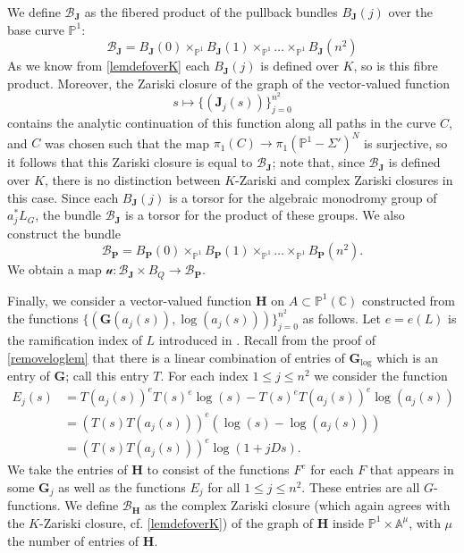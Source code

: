 \documentclass[10pt]{article}
\numberwithin{equation}{section}
\theoremstyle{plain}
\theoremstyle{definition}
\theoremstyle{remark}
\newcommand{\PP}{\mathbb{P}}
\begin{document}
We define $\mathcal{B}_{\mathbf{J}}$ as the fibered product of the pullback bundles $B_{\mathbf{J}}(j)$ over the base curve $\mathbb{P}^1$:
\[ \mathcal{B}_{\mathbf{J}} = B_{\mathbf{J}}(0) \times_{\mathbb{P}^1} B_{\mathbf{J}}(1) \times_{\mathbb{P}^1} \dots \times_{\mathbb{P}^1} B_{\mathbf{J}}(n^2) \]
As we know from \autoref{lemdefoverK} each $B_{\mathbf{J}}(j)$ is defined over $K$, so is this fibre product. Moreover, the Zariski closure of the graph of the vector-valued function
\begin{equation}
\label{BGgrapheq}
s \mapsto \{ (\mathbf{J}_{j}(s)) \}^{n^2}_{j=0} 
\end{equation}
contains the analytic continuation of this function along all paths in the curve $C$, and $C$ was chosen such that the map $\pi_1(C) \to \pi_1(\mathbb{P}^1 - \Sigma')^{N}$ is surjective, so it follows that this Zariski closure is equal to $\mathcal{B}_{\mathbf{J}}$; note that, since $\mathcal{B}_{\mathbf{J}}$ is defined over $K$, there is no distinction between $K$-Zariski and complex Zariski closures in this case. Since each $B_{\mathbf{J}}(j)$ is a torsor for the algebraic monodromy group of $a_{j}^{*} L_{G}$, the bundle $\mathcal{B}_{\mathbf{J}}$ is a torsor for the product of these groups. We also construct the bundle 
\begin{displaymath}
     \mathcal{B}_{\mathbf{P}} = B_{\mathbf{P}}(0) \times_{\mathbb{P}^1} B_{\mathbf{P}}(1) \times_{\mathbb{P}^1} \dots \times_{\mathbb{P}^1} B_{\mathbf{P}}(n^2) . 
\end{displaymath}
We obtain a map $\mathcal{u} : \mathcal{B}_{\mathbf{J}} \times B_{Q} \to \mathcal{B}_{\mathbf{P}}$. 

Finally, we consider a vector-valued function $\mathbf{H}$ on $A \subset \PP^1(\mathbb{C})$ constructed from the functions $\{ (\mathbf{G}(a_{j}(s)), \log(a_{j}(s))) \}^{n^2}_{j=0}$ as follows. Let $e = e(L)$ is the ramification index of $L$ introduced in . Recall from the proof of \autoref{removeloglem} that there is a linear combination of entries of $\mathbf{G}_{\operatorname{log}}$ which is an entry of $\mathbf{G}$; call this entry $T$. For each index $1 \leq j \leq n^2$ we consider the function 
\begin{align}
E_{j}(s) &= T(a_{j}(s))^{e} T(s)^{e} \log(s) - T(s)^{e} T(a_{j}(s))^{e} \log(a_{j}(s)) \nonumber \\
&= (T(s) T(a_{j}(s)))^{e} (\log(s) - \log(a_{j}(s))) \nonumber \\
&= (T(s) T(a_{j}(s)))^{e} \log(1 + jDs) \label{eqlog} .
\end{align}
We take the entries of $\mathbf{H}$ to consist of the functions $F^{e}$ for each $F$ that appears in some $\mathbf{G}_{j}$ as well as the functions $E_{j}$ for all $1 \leq j \leq n^2$. These entries are all $G$-functions. We define $\mathcal{B}_{\mathbf{H}}$ as the complex Zariski closure (which again agrees with the $K$-Zariski closure, cf. \autoref{lemdefoverK}) of the graph of $\mathbf{H}$ inside $\mathbb{P}^1 \times \mathbb{A}^{\mu}$, with $\mu$ the number of entries of $\mathbf{H}$. 
\end{document}
